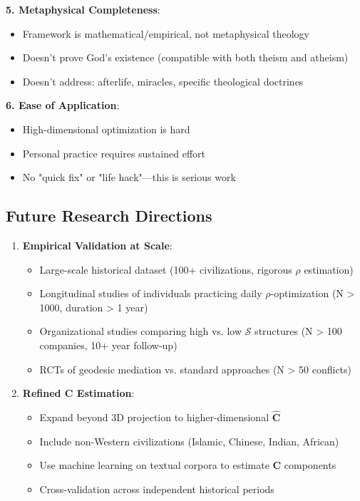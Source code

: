 \documentclass[11pt,a4paper]{article}
\theoremstyle{definition}
\theoremstyle{remark}
\begin{document}
\begin{small}
\begin{enumerate}
\begin{mdframed}[backgroundcolor=yellow!10,linewidth=2pt]
\textbf{5. Metaphysical Completeness}:
\begin{itemize}
    \item Framework is mathematical/empirical, not metaphysical theology
    \item Doesn't prove God's existence (compatible with both theism and atheism)
    \item Doesn't address: afterlife, miracles, specific theological doctrines
\end{itemize}

\textbf{6. Ease of Application}:
\begin{itemize}
    \item High-dimensional optimization is hard
    \item Personal practice requires sustained effort
    \item No "quick fix" or "life hack"—this is serious work
\end{itemize}
\end{mdframed}

\subsection{Future Research Directions}

\begin{enumerate}[leftmargin=*]
\item \textbf{Empirical Validation at Scale}:
    \begin{itemize}
        \item Large-scale historical dataset (100+ civilizations, rigorous \(\rho\) estimation)
        \item Longitudinal studies of individuals practicing daily \(\rho\)-optimization (N > 1000, duration > 1 year)
        \item Organizational studies comparing high vs. low \(\mathcal{S}\) structures (N > 100 companies, 10+ year follow-up)
        \item RCTs of geodesic mediation vs. standard approaches (N > 50 conflicts)
    \end{itemize}

\item \textbf{Refined \(\mathbf{C}\) Estimation}:
    \begin{itemize}
        \item Expand beyond 3D projection to higher-dimensional \(\hat{\mathbf{C}}\)
        \item Include non-Western civilizations (Islamic, Chinese, Indian, African)
        \item Use machine learning on textual corpora to estimate \(\mathbf{C}\) components
        \item Cross-validation across independent historical periods
    \end{itemize}


\end{enumerate}
\end{enumerate}
\end{small}
\end{document}

